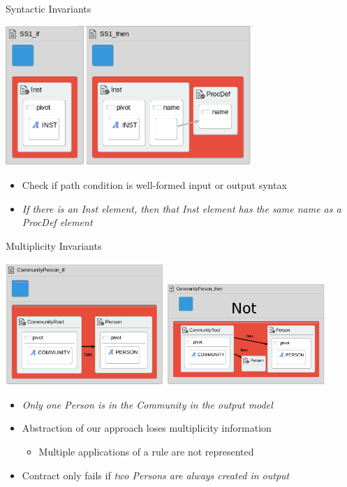 \documentclass[xcolor=dvipsnames, 12pt, handout]{beamer}
\begin{document}
\begin{frame}{Syntactic Invariants}
\begin{center}
\includegraphics[width=0.7\textwidth]{figures/syntactic_invariant}
\end{center}
\begin{itemize}
\item Check if path condition is well-formed input or output syntax
\item \textit{If there is an Inst element, then that Inst element has the same name as a ProcDef element}
\end{itemize}
\end{frame}

\begin{frame}{Multiplicity Invariants}
\begin{center}
\includegraphics[width=0.45\textwidth]{figures/communityPersonProp_if}
\includegraphics[width=0.45\textwidth]{figures/communityPersonProp_then}
\end{center}
\begin{itemize}
\item \textit{Only one Person is in the Community in the output model}
\end{itemize}
\begin{itemize}
\item Abstraction of our approach loses multiplicity information
\begin{itemize}
\item Multiple applications of a rule are not represented
\end{itemize}
\item Contract only fails if \textit{two Persons are always created in output}
\end{itemize}
\end{frame}
\end{document}
